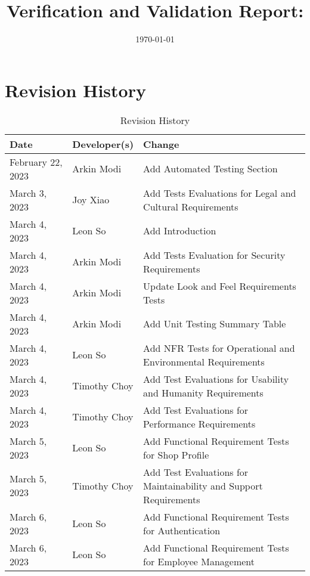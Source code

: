 \documentclass[12pt, titlepage]{article}
\begin{document}
\title{Verification and Validation Report: \progname}
\author{\authname}
\date{\today}

\maketitle


\section{Revision History}

\begin{table}[hp]
	\caption{Revision History} \label{TblRevisionHistory}
	\begin{tabularx}{\textwidth}{llX}
		\toprule
		\textbf{Date}     & \textbf{Developer(s)} & \textbf{Change}                                                   \\
		\midrule
		February 22, 2023 & Arkin Modi            & Add Automated Testing Section                                     \\
		March 3, 2023     & Joy Xiao              & Add Tests Evaluations for Legal and Cultural Requirements         \\
		March 4, 2023     & Leon So               & Add Introduction                                                  \\
		March 4, 2023     & Arkin Modi            & Add Tests Evaluation for Security Requirements                    \\
		March 4, 2023     & Arkin Modi            & Update Look and Feel Requirements Tests                           \\
		March 4, 2023     & Arkin Modi            & Add Unit Testing Summary Table                                    \\
		March 4, 2023     & Leon So               & Add NFR Tests for Operational and Environmental Requirements      \\
		March 4, 2023     & Timothy Choy          & Add Test Evaluations for Usability and Humanity Requirements      \\
		March 4, 2023     & Timothy Choy          & Add Test Evaluations for Performance Requirements                 \\
		March 5, 2023     & Leon So               & Add Functional Requirement Tests for Shop Profile                 \\
		March 5, 2023     & Timothy Choy          & Add Test Evaluations for Maintainability and Support Requirements \\
		March 6, 2023     & Leon So               & Add Functional Requirement Tests for Authentication               \\
		March 6, 2023     & Leon So               & Add Functional Requirement Tests for Employee Management          \\
		\bottomrule
	\end{tabularx}
\end{table}
\newpage
\end{document}
